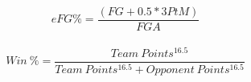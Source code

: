 \documentclass{article}
\begin{document}
\[
 eFG\% = \frac{(FG + 0.5 * 3PtM)}{FGA}
\] \\[10pt]

\[
 Win\ \% = \frac{Team\ Points^{16.5}}{Team\ Points^{16.5} + Opponent\ Points ^{16.5}}
\]
\end{document}
